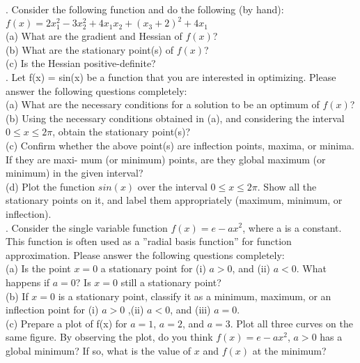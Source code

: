 \documentclass{article} %
\begin{document}
{
    . Consider the following function and do the following (by hand): \\
    $ f(x) = 2x_1^2 - 3x_2^2 + 4x_1x_2 + (x_3 + 2)^2 + 4x_1 $ \\
    (a) What are the gradient and Hessian of $ f(x) $? \\
    (b) What are the stationary point(s) of $ f(x) $? \\
    (c) Is the Hessian positive-definite? \\

    . Let f(x) = sin(x) be a function that you are interested in optimizing. Please answer the following
    questions completely: \\
    (a) What are the necessary conditions for a solution to be an optimum of $ f(x) $? \\
    (b) Using the necessary conditions obtained in (a), and considering the interval $ 0 \leq x \leq 2\pi $, obtain
    the stationary point(s)? \\
    (c) Confirm whether the above point(s) are inflection points, maxima, or minima. If they are maxi-
    mum (or minimum) points, are they global maximum (or minimum) in the given interval? \\
    (d) Plot the function $ sin(x) $ over the interval $ 0 \leq x \leq 2\pi $. Show all the stationary points on it, and
    label them appropriately (maximum, minimum, or inflection). \\
    
    . Consider the single variable function $ f(x) = e - ax^2 $, where a is a constant. This function is often used as
    a ”radial basis function” for function approximation. Please answer the following questions completely: \\
    (a) Is the point $ x = 0 $ a stationary point for (i) $ a > 0 $, and (ii) $ a < 0 $. What happens if $ a = 0 $? Is
    $ x = 0 $ still a stationary point? \\
    (b) If $ x = 0 $ is a stationary point, classify it as a minimum, maximum, or an inflection point for (i)
    $ a > 0 $ ,(ii) $ a < 0 $, and (iii) $ a = 0 $. \\
    (c) Prepare a plot of f(x) for $ a = 1 $, $ a = 2 $, and $ a = 3 $. Plot all three curves on the same figure. By
    observing the plot, do you think $ f(x) = e - ax^2 $, $ a > 0 $ has a global minimum? If so, what is the
    value of $ x $ and $ f(x) $ at the minimum? \\

}
\end{document}
